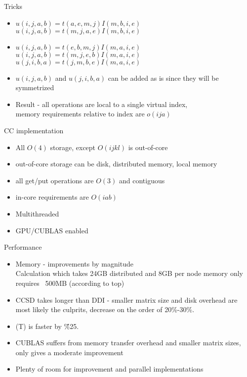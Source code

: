 \documentclass{beamer}
\begin{document}
\begin{frame}{Tricks}
  \begin{itemize}
  \item $u(i,j,a,b) = t(a,e,m,j) I(m,b,i,e)$ \\
    $u(i,j,a,b) = t(m,j,a,e) I(m,b,i,e)$
  \item $u(i,j,a,b) = t(e,b,m,j) I(m,a,i,e)$ \\
    $u(i,j,a,b) = t(m,j,e,b) I(m,a,i,e)$ \\
    $u(j,i,b,a) = t(j,m,b,e) I(m,a,i,e)$
  \item $u(i,j,a,b)$ and $u(j,i,b,a)$ can be added as is since they
    will be symmetrized
  \item Result - all operations are local to a single virtual index, \\
     memory requirements relative to index are $o(ija)$
  \end{itemize}
\end{frame}

\begin{frame}{CC implementation}
  \begin{itemize}
  \item All $O(4)$  storage, except $O(ijkl)$ is out-of-core
  \item out-of-core storage can be disk, distributed memory, local memory
  \item all get/put operations are $O(3)$ and contiguous
  \item in-core requirements are $O(iab)$ 
  \item Multithreaded
  \item GPU/CUBLAS enabled
  \end{itemize}
\end{frame}

\begin{frame}{Performance}
  \begin{itemize}
  \item Memory - improvements by magnitude \\
    Calculation which takes 24GB distributed and 8GB per node memory
    only requires ~500MB (according to top)
  \item CCSD takes longer than DDI - smaller matrix size and disk overhead
    are most likely the culprits, decrease on the order of 20\%-30\%.
    \item (T) is faster by \~\%25.
  \item CUBLAS suffers from memory transfer overhead and smaller matrix
    sizes, only gives a  moderate improvement
  \item Plenty of room for improvement and parallel implementations
  \end{itemize}
\end{frame}
\end{document}
